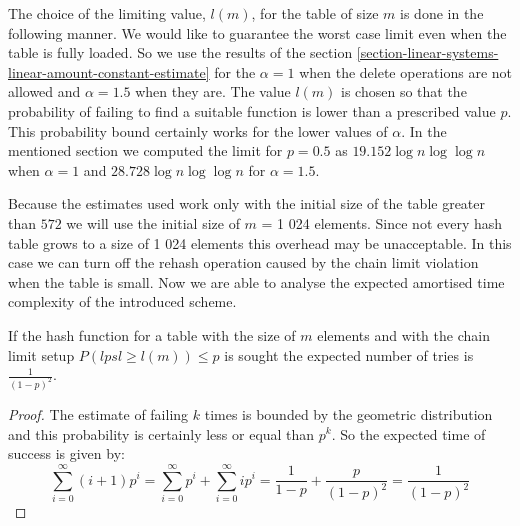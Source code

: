 The choice of the limiting value, $l(m)$, for the table of size $m$ is done in the following manner. We would like to guarantee the worst case limit even when the table is fully loaded. So we use the results of the section \ref{section-linear-systems-linear-amount-constant-estimate} for the $\alpha = 1$ when the delete operations are not allowed and $\alpha = 1.5$ when they are. The value $l(m)$ is chosen so that the probability of failing to find a suitable function is lower than a prescribed value $p$. This probability bound certainly works for the lower values of $\alpha$. In the mentioned section we computed the limit for $p = 0.5$ as $19.152 \log n \log \log n$ when $\alpha = 1$ and $28.728 \log n \log \log n$ for $\alpha = 1.5$.

Because the estimates used work only with the initial size of the table greater than $572$ we will use the initial size of $m$ = 1 024 elements. Since not every hash table grows to a size of 1 024 elements this overhead may be unacceptable. In this case we can turn off the rehash operation caused by the chain limit violation when the table is small. Now we are able to analyse the expected amortised time complexity of the introduced scheme.

\begin{lemma}
\label{lemma-linear-transformations-tries}
If the hash function for a table with the size of $m$ elements and with the chain limit setup $P(lpsl \geq l(m)) \leq p$ is sought the expected number of tries is $\frac{1}{(1 - p)^2}$.
\end{lemma}
\begin{proof}
The estimate of failing $k$ times is bounded by the geometric distribution and this probability is certainly less or equal than $p^k$. So the expected time of success is given by:
\begin{displaymath}
\sum_{i = 0}^{\infty} (i + 1)p^i = \sum_{i = 0}^{\infty}p^i + \sum_{i = 0}^{\infty}ip^i = \frac{1}{1 - p} + \frac{p}{(1- p)^2} = \frac{1}{(1 - p)^2}
\end{displaymath}
\end{proof}

